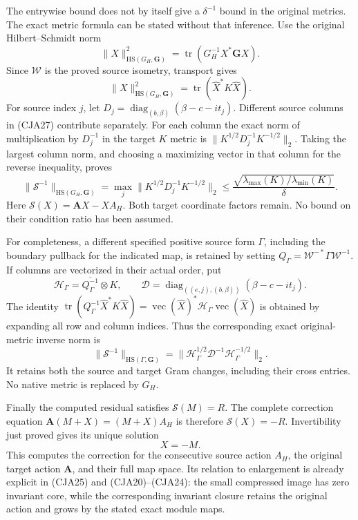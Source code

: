 \documentclass[11pt,a4paper]{article}
\begin{document}
The entrywise bound does not by itself give a
\(\delta^{-1}\) bound in the original metrics.
The exact metric formula can be stated without that inference.
Use the original Hilbert--Schmidt norm
\[
 \|X\|_{\mathrm{HS}(G_H,\mathbf G)}^2
 =\operatorname{tr}(G_H^{-1}X^*\mathbf GX).
 \]
Since \(\mathcal W\) is the proved source isometry, transport gives
\begin{equation}
 \|X\|_{\mathrm{HS}(G_H,\mathbf G)}^2
      =\operatorname{tr}(\widehat X^*K\widehat X).
 \tag{CJA27}
\end{equation}
For source index \(j\), let
\(D_j=\operatorname{diag}_{(b,\beta)}(\beta-c-it_j)\).
Different source columns in (CJA27) contribute separately.
For each column the exact norm of multiplication by \(D_j^{-1}\)
in the target \(K\) metric is
\(\|K^{1/2}D_j^{-1}K^{-1/2}\|_2\).
Taking the largest column norm, and choosing a maximizing vector
in that column for the reverse inequality, proves
\begin{equation}
 \boxed{\|\mathscr S^{-1}\|_{\mathrm{HS}(G_H,\mathbf G)}
 =\max_j\|K^{1/2}D_j^{-1}K^{-1/2}\|_2
 \leq\frac{\sqrt{\lambda_{\max}(K)/\lambda_{\min}(K)}}{\delta}.}
 \tag{CJA28}
\end{equation}
Here \(\mathscr S(X)=\mathbf AX-XA_H\).
Both target coordinate factors remain.
No bound on their condition ratio has been assumed.

For completeness, a different specified positive source form
\(\Gamma\), including the boundary pullback for the indicated map, is retained
by setting
\(Q_\Gamma=\mathcal W^{-*}\Gamma\mathcal W^{-1}\).
If columns are vectorized in their actual order, put
\[
 \mathcal H_\Gamma=\overline{Q_\Gamma^{-1}}\otimes K,\qquad
 \mathcal D=\operatorname{diag}_{((e,j),(b,\beta))}
                         (\beta-c-it_j).
 \]
The identity
\(\operatorname{tr}(Q_\Gamma^{-1}\widehat X^*K\widehat X)
=\operatorname{vec}(\widehat X)^*
 \mathcal H_\Gamma\operatorname{vec}(\widehat X)\)
is obtained by expanding all row and column indices.
Thus the corresponding exact original-metric inverse norm is
\begin{equation}
 \|\mathscr S^{-1}\|_{\mathrm{HS}(\Gamma,\mathbf G)}
 =\|\mathcal H_\Gamma^{1/2}\mathcal D^{-1}
             \mathcal H_\Gamma^{-1/2}\|_2 .
 \tag{CJA29}
\end{equation}
It retains both the source and target Gram changes, including
their cross entries.  No native metric is replaced by \(G_H\).

Finally the computed residual satisfies \(\mathscr S(M)=R\).
The complete correction equation
\(\mathbf A(M+X)=(M+X)A_H\) is therefore
\(\mathscr S(X)=-R\).
Invertibility just proved gives its unique solution
\begin{equation}
 \boxed{X=-M.}
 \tag{CJA30}
\end{equation}
This computes the correction for the consecutive source action \(A_H\),
the original target action \(\mathbf A\), and their full map space.
Its relation to enlargement is already explicit in (CJA25) and
(CJA20)--(CJA24): the small compressed image has zero invariant core,
while the corresponding invariant closure retains the original action
and grows by the stated exact module maps.
\end{document}
